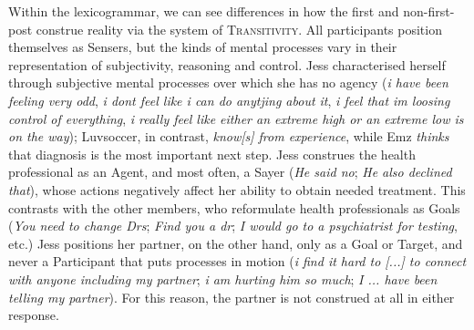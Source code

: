 \documentclass{article}
\begin{document}
Within the lexicogrammar, we can see differences in how the first and non-first-post construe reality via the system of \textsc{Transitivity}. All participants position themselves as Sensers, but the kinds of mental processes vary in their representation of subjectivity, reasoning and control. Jess characterised herself through subjective mental processes over which she has no agency (\emph{i have been feeling very odd}, \emph{i dont feel like i  can do anytjing about it}, \emph{i feel that im loosing control of everything}, \emph{i really feel like either an extreme high or an extreme low is on the way}); Luvsoccer, in contrast, \emph{know[s] from experience}, while Emz \emph{thinks} that diagnosis is the most important next step. Jess construes the health professional as an Agent, and most often, a Sayer (\emph{He said no}; \emph{He also declined that}), whose actions negatively affect her ability to obtain needed treatment. This contrasts with the other members, who reformulate health professionals as Goals (\emph{You need to change Drs}; \emph{Find you a dr}; \emph{I would go to a psychiatrist for testing}, etc.) Jess positions her partner, on the other hand, only as a Goal or Target, and never a Participant that puts processes in motion (\emph{i find it hard to [...] to connect with anyone including my partner}; \emph{i am hurting him so much}; \emph{I ... have been telling my partner}). For this reason, the partner is not construed at all in either response.

\end{document}
